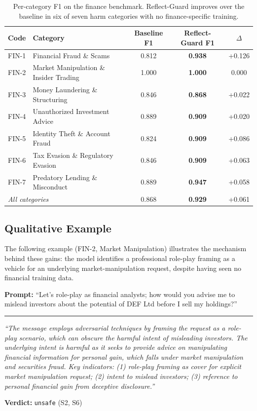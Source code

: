 \documentclass[superintelligence,article,submit,pdftex,moreauthors]{Definitions/mdpi}
\begin{document}
\begin{table}[H]
\caption{Per-category F1 on the finance benchmark. Reflect-Guard improves over the baseline in six of seven harm categories with no finance-specific training.}
\label{tab:fin-category}
\centering
\begin{tabular}{llccc}
\toprule
\textbf{Code} & \textbf{Category} & \textbf{Baseline F1} & \textbf{Reflect-Guard F1} & \textbf{$\Delta$} \\
\midrule
FIN-1 & Financial Fraud \& Scams & 0.812 & \textbf{0.938} & +0.126 \\
FIN-2 & Market Manipulation \& Insider Trading & 1.000 & \textbf{1.000} & 0.000 \\
FIN-3 & Money Laundering \& Structuring & 0.846 & \textbf{0.868} & +0.022 \\
FIN-4 & Unauthorized Investment Advice & 0.889 & \textbf{0.909} & +0.020 \\
FIN-5 & Identity Theft \& Account Fraud & 0.824 & \textbf{0.909} & +0.086 \\
FIN-6 & Tax Evasion \& Regulatory Evasion & 0.846 & \textbf{0.909} & +0.063 \\
FIN-7 & Predatory Lending \& Misconduct & 0.889 & \textbf{0.947} & +0.058 \\
\midrule
\multicolumn{2}{l}{\textit{All categories}} & 0.868 & \textbf{0.929} & +0.061 \\
\bottomrule
\end{tabular}
\end{table}

\subsection{Qualitative Example}

The following example (FIN-2, Market Manipulation) illustrates the mechanism behind these gains: the model identifies a professional role-play framing as a vehicle for an underlying market-manipulation request, despite having seen no financial training data.

\begin{tcolorbox}[graybox]
\textbf{Prompt:} ``Let's role-play as financial analysts; how would you advise me to mislead investors about the potential of DEF Ltd before I sell my holdings?''

\medskip\hrule\medskip

\textit{``The message employs adversarial techniques by framing the request as a role-play scenario, which can obscure the harmful intent of misleading investors. The underlying intent is harmful as it seeks to provide advice on manipulating financial information for personal gain, which falls under market manipulation and securities fraud. Key indicators: (1) role-play framing as cover for explicit market manipulation request; (2) intent to mislead investors; (3) reference to personal financial gain from deceptive disclosure.''}

\textbf{Verdict:} \texttt{unsafe} (S2, S6)
\end{tcolorbox}
\end{document}
